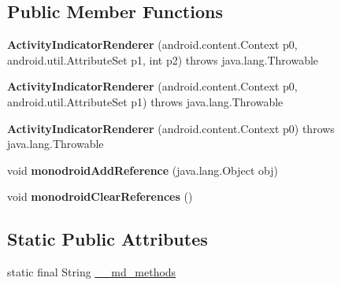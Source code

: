 \subsection*{Public Member Functions}
\begin{DoxyCompactItemize}
\item 
\mbox{\label{classmd5b60ffeb829f638581ab2bb9b1a7f4f3f_1_1ActivityIndicatorRenderer_ab2883ac0bdf26e5fa667b0c58010f930}} 
{\bfseries Activity\+Indicator\+Renderer} (android.\+content.\+Context p0, android.\+util.\+Attribute\+Set p1, int p2)  throws java.\+lang.\+Throwable 	
\item 
\mbox{\label{classmd5b60ffeb829f638581ab2bb9b1a7f4f3f_1_1ActivityIndicatorRenderer_aa9b11b5109e56ef935521245926c51e5}} 
{\bfseries Activity\+Indicator\+Renderer} (android.\+content.\+Context p0, android.\+util.\+Attribute\+Set p1)  throws java.\+lang.\+Throwable 	
\item 
\mbox{\label{classmd5b60ffeb829f638581ab2bb9b1a7f4f3f_1_1ActivityIndicatorRenderer_a93cc2af35d0f6c5f860f1c04d755eb3e}} 
{\bfseries Activity\+Indicator\+Renderer} (android.\+content.\+Context p0)  throws java.\+lang.\+Throwable 	
\item 
\mbox{\label{classmd5b60ffeb829f638581ab2bb9b1a7f4f3f_1_1ActivityIndicatorRenderer_a5d56cfc2ee6e98e26f68994067dd0cf2}} 
void {\bfseries monodroid\+Add\+Reference} (java.\+lang.\+Object obj)
\item 
\mbox{\label{classmd5b60ffeb829f638581ab2bb9b1a7f4f3f_1_1ActivityIndicatorRenderer_a53c663b171496cdee3e0eca02ade7e9d}} 
void {\bfseries monodroid\+Clear\+References} ()
\end{DoxyCompactItemize}
\subsection*{Static Public Attributes}
\begin{DoxyCompactItemize}
\item 
static final String \hyperlink{classmd5b60ffeb829f638581ab2bb9b1a7f4f3f_1_1ActivityIndicatorRenderer_ab234fd2d3a2a9112481b6ec6f5f98c1d}{\+\_\+\+\_\+md\+\_\+methods}
\end{DoxyCompactItemize}
